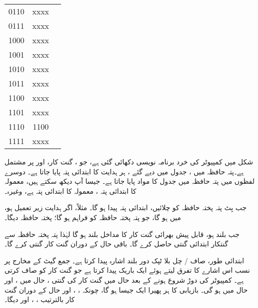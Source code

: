 \begin{table}
\begin{minipage}{0.35\textwidth}
\begin{tabular}{CCR}
0110&xxxx&\\
0111&xxxx&\\
1000&xxxx&\\
1001&xxxx&\\
1010&xxxx&\\
1011&xxxx&\\
1100&xxxx&\\
1101&xxxx&\\
1110&1100&\\
1111&xxxx&\\
\bottomrule
\end{tabular}
\end{minipage}
\end{table}

شکل  میں کمپیوٹر  کی خرد  برنامہ  نویسی دکھائی گئی ہے، جو   ،  گنت کار، اور  پر مشتمل ہے۔پتہ حافظہ میں ، جدول      میں دیے گئے ، ہر  ہدایت کا  ابتدائی پتہ  پایا جاتا ہے۔ دوسرے لفظوں میں  پتہ حافظہ میں جدول  کا مواد پایا جاتا ہے۔ جیسا آپ دیکھ سکتے ہیں،  معمولہ کا ابتدائی پتہ  ،  معمولہ کا  ابتدائی پتہ  ہے، وغیرہ۔

جب بِٹ     پتہ پختہ حافظہ   کو چلائیں،  ابتدائی پتہ پیدا ہو گا۔ مثلاً، اگر  ہدایت زیر تعمیل ہو،  میں  ہو گا، جو  پتہ پختہ حافظہ کو  فراہم  ہو گا؛ پختہ حافظہ  دیگا۔

جب  بلند ہو، قابل پیش بھرائی گنت کار کا مداخل بلند ہو گا لہٰذا  پتہ پختہ حافظہ سے گنتکار   ابتدائی  گنتی    حاصل کرے گا۔ باقی  حال کے دوران گنت کار گنتی کرے گا۔

ابتدائی طور، صاف /  چل  بلا ٹپک دور  بلند  اشارہ پیدا کرتا ہے۔ جمع گیٹ کے مخارج پر نسب  اس اشارے کا تفرق لیتے ہوئے ایک باریک پیدا کرتا ہے جو گنت کار کو صاف کرتی ہے۔ کمپیوٹر کی دوڑ   شروع ہونے  کے بعد  حال میں گنت کار کی گنتی ،  حال میں ، اور  حال میں  ہو گی۔ بازیابی  کا ہر پھیرا  ایک جیسا ہو گا، چونکہ ، ، اور  حال کے دوران گنت کار  بالترتیب ، ، اور  دیگا۔


